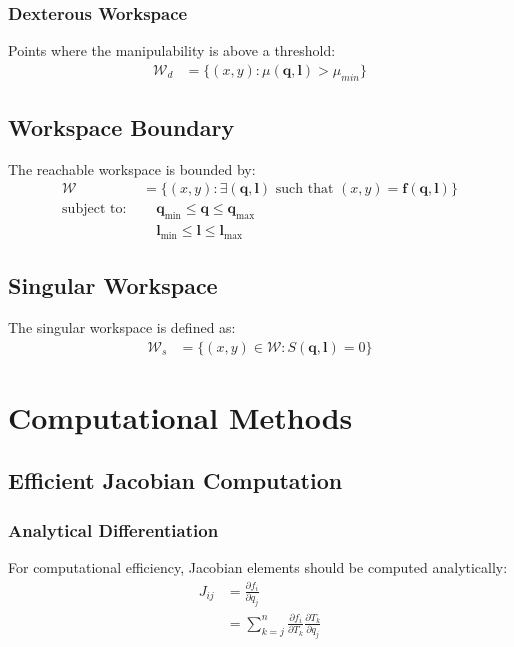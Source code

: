 \documentclass[11pt,a4paper]{article}
\begin{document}
\subsubsection{Dexterous Workspace}
Points where the manipulability is above a threshold:
\begin{align}
\mathcal{W}_d &= \{(x, y) : \mu(\bm{q}, \bm{l}) > \mu_{min}\}
\end{align}

\subsection{Workspace Boundary}
The reachable workspace is bounded by:
\begin{align}
\mathcal{W} &= \{(x, y) : \exists (\bm{q}, \bm{l}) \text{ such that } (x, y) = \bm{f}(\bm{q}, \bm{l})\} \\
\text{subject to: } &\quad \bm{q}_{\min} \leq \bm{q} \leq \bm{q}_{\max} \\
&\quad \bm{l}_{\min} \leq \bm{l} \leq \bm{l}_{\max}
\end{align}

\subsection{Singular Workspace}
The singular workspace is defined as:
\begin{align}
\mathcal{W}_s &= \{(x, y) \in \mathcal{W} : S(\bm{q}, \bm{l}) = 0\}
\end{align}

\section{Computational Methods}

\subsection{Efficient Jacobian Computation}

\subsubsection{Analytical Differentiation}
For computational efficiency, Jacobian elements should be computed analytically:
\begin{align}
J_{ij} &= \frac{\partial f_i}{\partial q_j} \\
&= \sum_{k=j}^{n} \frac{\partial f_i}{\partial T_k} \frac{\partial T_k}{\partial q_j}
\end{align}
\end{document}
